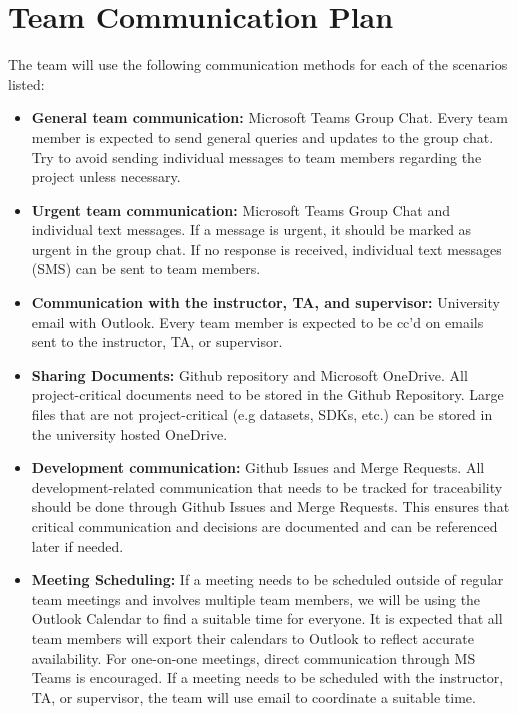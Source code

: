 \documentclass{article}
\begin{document}


\section{Team Communication Plan}

The team will use the following communication methods for each of the scenarios listed:
\begin{itemize}
  \item \textbf{General team communication:} Microsoft Teams Group Chat. Every team member is expected to send general queries and updates to the group chat.
  Try to avoid sending individual messages to team members regarding the project unless necessary.
  \item \textbf{Urgent team communication:} Microsoft Teams Group Chat and individual text messages. 
  If a message is urgent, it should be marked as urgent in the group chat. If no response is received, individual text messages (SMS) can be sent to team members.
  \item \textbf{Communication with the instructor, TA, and supervisor:} University email with Outlook. Every team member is expected to be cc'd on emails sent to the instructor, TA, or supervisor.
  \item \textbf{Sharing Documents:} Github repository and Microsoft OneDrive. All project-critical documents need to be stored in the Github Repository. 
  Large files that are not project-critical (e.g datasets, SDKs, etc.) can be stored in the university hosted OneDrive.
  \item \textbf{Development communication:} Github Issues and Merge Requests. All development-related communication that needs to be tracked for 
  traceability should be done through Github Issues and Merge Requests. This ensures that critical communication and decisions 
  are documented and can be referenced later if needed.
  \item \textbf{Meeting Scheduling:} If a meeting needs to be scheduled outside of regular team meetings and involves multiple team members, we will be using 
  the Outlook Calendar to find a suitable time for everyone. It is expected that all team members will export their calendars to Outlook to reflect accurate availability. For one-on-one meetings, direct communication through MS Teams is encouraged. If a meeting needs to be scheduled
  with the instructor, TA, or supervisor, the team will use email to coordinate a suitable time. 
\end{itemize}
\end{document}
